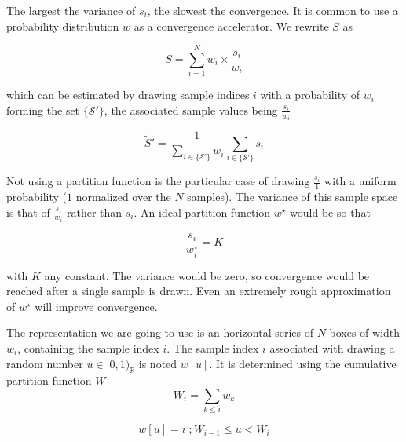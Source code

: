 \documentclass[./thesis.tex]{subfiles}
\begin{document}

The largest the variance of $s_i$, the slowest the convergence. It is common to use a probability distribution $w$ as a convergence accelerator. We rewrite $S$ as 

\begin{equation}
S = \sum_{i=1}^N {w_i \times \frac{s_i}{w_i}}
\end{equation}

which can be estimated by drawing sample indices $i$ with a probability of $w_i$ forming the set $\{\mathcal{S'}\}$, the associated sample values being $\frac{s_i}{w_i}$

\begin{equation}
\tilde S' = \frac{1} {\sum_{i \in \{ \mathcal{S'} \} } w_i} \sum_{i \in \{\mathcal{S'}\}} {s_i}
\end{equation}

Not using a partition function is the particular case of drawing $\frac{s_i}{1}$ with a uniform probability ($1$ normalized over the $N$ samples). The variance of this sample space is that of $\frac{s_i}{w_i}$ rather than $s_i$. An ideal partition function $w^\star$ would be so that

\begin{equation}
\frac{s_i}{w^\star_i} = K
\end{equation}

with $K$ any constant. The variance would be zero, so convergence would be reached after a single sample is drawn. Even an extremely rough approximation of $w^\star$ will improve convergence.



The representation we are going to use is an horizontal series of $N$ boxes of width $w_i$, containing the sample index $i$.
The sample index $i$ associated with drawing a random number $u \in [0,1)_\mathbb{R}$ is noted $w[u]$. It is determined using the cumulative partition function $W$
\begin{equation}
W_i = \sum_{k \leq i} w_k
\end{equation}

\begin{equation}
w[u] = i \;; W_{i-1} \leq u < W_i
\end{equation}
\end{document}

